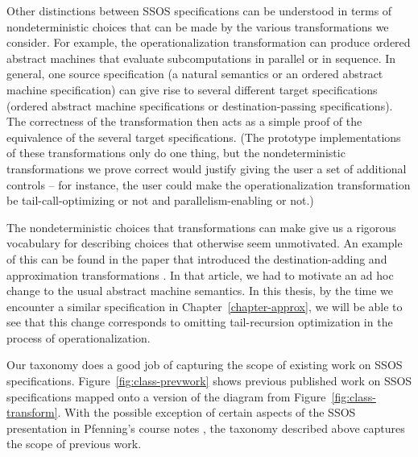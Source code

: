 Other distinctions between SSOS specifications can be understood in
terms of nondeterministic choices that can be made by the various
transformations we consider. For example, the operationalization
transformation can produce ordered abstract machines that evaluate
subcomputations in parallel or in sequence. In general, one source
specification (a natural semantics or an ordered abstract machine
specification) can give rise to several different target
specifications (ordered abstract machine specifications or
destination-passing specifications). The correctness of the
transformation then acts as a simple proof of the equivalence of the
several target specifications. (The prototype implementations of these
transformations only do one thing, but the nondeterministic
transformations we prove correct would justify giving the user a set
of additional controls -- for instance, the user could make the
operationalization transformation be tail-call-optimizing or
not and parallelism-enabling or not.)

The nondeterministic choices that transformations can make give us a
rigorous vocabulary for describing choices that otherwise seem
unmotivated. An example of this can be found in the paper that introduced
the destination-adding and approximation transformations
\cite{simmons11logical}. In that article, we had to motivate an ad hoc
change to the usual abstract machine semantics. In this thesis, by the
time we encounter a similar specification in Chapter~\ref{chapter-approx}, 
we will be
able to see that this change corresponds to omitting tail-recursion
optimization in the process of operationalization.

Our taxonomy does a good job of capturing the scope of existing work
on SSOS specifications.  Figure~\ref{fig:class-prevwork} shows
previous published work on SSOS specifications mapped onto a version
of the diagram from Figure~\ref{fig:class-transform}.  With the
possible exception of certain aspects of the SSOS presentation in
Pfenning's course notes \cite{pfenning12substructural}, the taxonomy
described above captures the scope of previous work.



